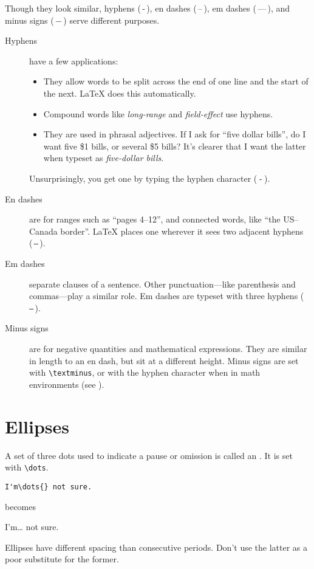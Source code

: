 Though they look similar,
hyphens (\,-\,), en dashes (\,--\,),
em dashes (\,---\,), and minus signs (\,$-$\,)
serve different purposes.
\begin{description}
\item[Hyphens] have a few applications:
    \begin{itemize}[leftmargin=*]
    \item They allow words to be split across the end of one line and the
        start of the next.
        \LaTeX{} does this automatically.
    \item Compound words like \emph{long-range} and \emph{field-effect}
        use hyphens.
    \item They are used in phrasal adjectives.
        If I ask for ``five dollar bills''\punckern,
        do I want five \$1 bills, or several \$5 bills?
        It's clearer that I want the latter when typeset as
        \emph{five-dollar bills}.
    \end{itemize}
    Unsurprisingly, you get one by typing the hyphen character (\,\texttt{-}\,).

\item[En dashes] are for ranges such as ``pages 4--12''\quotekern,
    and connected words, like ``the \mbox{US--Canada} border''\quotekern.
    \LaTeX{} places one wherever it sees two adjacent hyphens
    (\,\texttt{--}\,).

\item[Em dashes] separate clauses of a sentence.
    Other punctuation---like parenthesis and commas---play a similar
    role.
    Em dashes are typeset with three hyphens (\,\texttt{---}\,).

\item[Minus signs] are for negative quantities and
    mathematical expressions.
    They are similar in length to an en dash,
    but sit at a different height.
    Minus signs are set with \verb|\textminus|,
    or with the hyphen character
    when in math environments (see ).
\end{description}

\section{Ellipses}

A set of three dots used to indicate a pause or omission is called an
.
It is set with \verb|\dots|.
\begin{leftfigure}
\begin{lstlisting}
I'm\dots{} not sure.
\end{lstlisting}
\end{leftfigure}
becomes
\begin{leftfigure}
\lm%
I'm\dots{} not sure.
\end{leftfigure}
Ellipses have different spacing than consecutive periods.
Don't use the latter as a poor substitute for the former.

